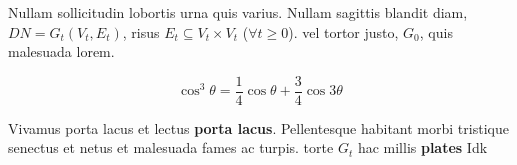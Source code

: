 \documentclass[a0paper,portrait]{baposter}
\begin{document}
\begin{poster}
{Nullam sollicitudin lobortis urna quis varius. Nullam sagittis blandit diam, $DN = G_t(V_t,E_t)$, risus $E_t \subseteq V_t \times V_t$ ($\forall t \geq 0$). vel tortor justo, $G_0$, quis malesuada lorem.

\begin{equation}
\cos^3 \theta =\frac{1}{4}\cos\theta+\frac{3}{4}\cos 3\theta
\label{eq:refname}
\end{equation}

Vivamus porta lacus et lectus \textbf{porta lacus}. Pellentesque habitant morbi tristique senectus et netus et malesuada fames ac turpis. torte $G_t$ hac millis \textbf{plates} Idk 
}


\end{poster}
\end{document}
